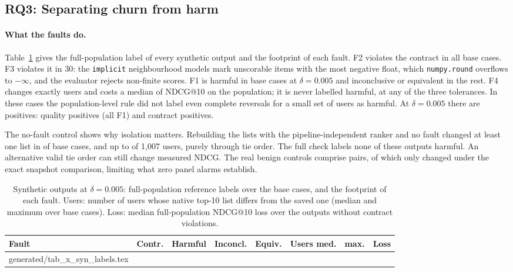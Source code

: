 \documentclass[11pt,a4paper]{article}
\makeatletter
\newcommand{\tablebody}[1]{\@@input generated/#1.tex }
\makeatother
\begin{document}
\subsection{RQ3: Separating churn from harm}

\paragraph{What the faults do.} Table~\ref{tab:syn-labels} gives the
full-population label of every synthetic output and the footprint of each
fault. F2 violates the contract in all \synBase{} base cases. F3 violates it in
30: the \texttt{implicit} neighbourhood models mark unscorable items with the
most negative float, which \texttt{numpy.round} overflows to $-\infty$, and
the evaluator rejects non-finite scores. F1 is harmful in \synFOne{} base cases
at $\delta=0.005$ and inconclusive or equivalent in the rest. F4 changes
exactly \synFFourMaxUsers{} users and costs a median of \synFFourMedianLoss{}
NDCG@10 on the population; it is never labelled harmful, at any of the three
tolerances. In these cases the population-level rule did not label even
complete reversals for a small set of users as harmful. At $\delta=0.005$
there are \synPositives{} positives: \synQualityPositives{} quality positives
(all F1) and \synContractPositives{} contract positives.

The no-fault control shows why isolation matters. Rebuilding the lists with
the pipeline-independent ranker and no fault changed at least one list in
\synControlChangedCases{} of \synBase{} base cases, and up to
\synControlMaxUsers{} of 1{,}007 users, purely through tie order. The full
check labels none of these outputs harmful. An alternative valid tie order
can still change measured NDCG. The real benign controls comprise
\synBenign{} pairs, of which only \synSnapshotBenign{} changed under the
exact snapshot comparison, limiting what zero panel alarms establish.

\begin{table}[htbp]
  \centering
  \caption{Synthetic outputs at $\delta=0.005$: full-population reference
    labels over the \synBase{} base cases, and the footprint of each fault.
    Users: number of users whose native top-10 list differs from the saved
    one (median and maximum over base cases). Loss: median full-population
    NDCG@10 loss over the outputs without contract violations.}
  \label{tab:syn-labels}
  \footnotesize\setlength{\tabcolsep}{3pt}
  \begin{tabular}{@{}lrrrrrrr@{}}
    \toprule
    Fault & Contr. & Harmful & Inconcl. & Equiv. & Users med. & max. & Loss \\
    \midrule
    \tablebody{tab_x_syn_labels}
    \bottomrule
  \end{tabular}
\end{table}
\end{document}
